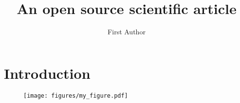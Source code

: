 \documentclass[twocolumn]{aastex631}
\begin{document}
\title{An open source scientific article}

\author{First Author}

\begin{abstract}
    \blindtext
\end{abstract}

\section{Introduction}

\blindtext

\begin{figure}[ht!]
    \begin{centering}
        \texttt{[image: figures/my\_figure.pdf]}
        \caption{
            \blindtext
        }
        \label{fig:my_figure}
    \end{centering}
\end{figure}
\end{document}
